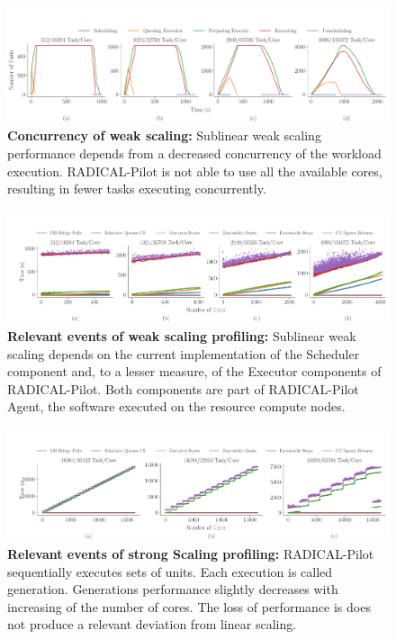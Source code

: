 \documentclass{article}
\begin{document}
\begin{figure}
  \centering
  \includegraphics[width=\textwidth]{figures/paper_titan_rp_synapse_weak_scaling_concurrency_horizontal.pdf}
  \caption{\textbf{Concurrency of weak scaling:} Sublinear weak scaling
  performance depends from a decreased concurrency of the workload execution.
  RADICAL-Pilot is not able to use all the available cores, resulting in
  fewer tasks executing concurrently.}\label{fig:ws-concurrency}
\end{figure}

\begin{figure}
  \centering
  \includegraphics[width=\textwidth]{figures/paper_titan_rp_synapse_weak_scaling_events_timeline_horizontal.pdf}
  \caption{\textbf{Relevant events of weak scaling profiling:} Sublinear weak
	scaling depends on the current implementation of the Scheduler component
	and, to a lesser measure, of the Executor components of RADICAL-Pilot.
	Both components are part of RADICAL-Pilot Agent, the software executed on
	the resource compute nodes. }\label{fig:ws-events}
\end{figure}

\begin{figure}
  \centering
  \includegraphics[width=\textwidth]{figures/paper_titan_rp_synapse_strong_scaling_events_timeline_horizontal.pdf}
  \caption{\textbf{Relevant events of strong Scaling profiling:}
  RADICAL-Pilot sequentially executes sets of units. Each execution is called
  generation. Generations performance slightly decreases with increasing of
  the number of cores. The loss of performance is does not produce a relevant
  deviation from linear scaling.}\label{fig:ss-events}
\end{figure}
\end{document}
